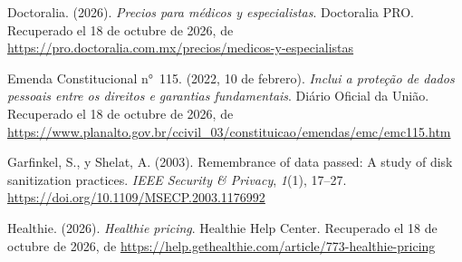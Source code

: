 \documentclass[12pt, a4paper]{article}
\begin{document}
\begin{list}{}{\setlength{\leftmargin}{1.27cm}\setlength{\itemindent}{-1.27cm}%
  \setlength{\labelwidth}{0pt}\setlength{\labelsep}{0pt}\setlength{\itemsep}{6pt}}


\item Doctoralia. (2026). \textit{Precios para médicos y
  especialistas}. Doctoralia PRO.
Recuperado el 18 de octubre de 2026, de \url{https://pro.doctoralia.com.mx/precios/medicos-y-especialistas}
 
 

\item Emenda Constitucional n°~115. (2022, 10 de febrero).
  \textit{Inclui a proteção de dados pessoais entre os direitos e
  garantias fundamentais}. Diário Oficial da União. Recuperado el 18 de octubre de 2026, de \url{https://www.planalto.gov.br/ccivil_03/constituicao/emendas/emc/emc115.htm}



\item Garfinkel, S., y Shelat, A. (2003). Remembrance of data
  passed: A study of disk sanitization practices.
  \textit{IEEE Security \& Privacy}, \textit{1}(1), 17--27.
  \url{https://doi.org/10.1109/MSECP.2003.1176992}



\item Healthie. (2026). \textit{Healthie pricing}. Healthie Help Center.
  Recuperado el 18 de octubre de 2026, de \url{https://help.gethealthie.com/article/773-healthie-pricing}


\end{list}
\end{document}
